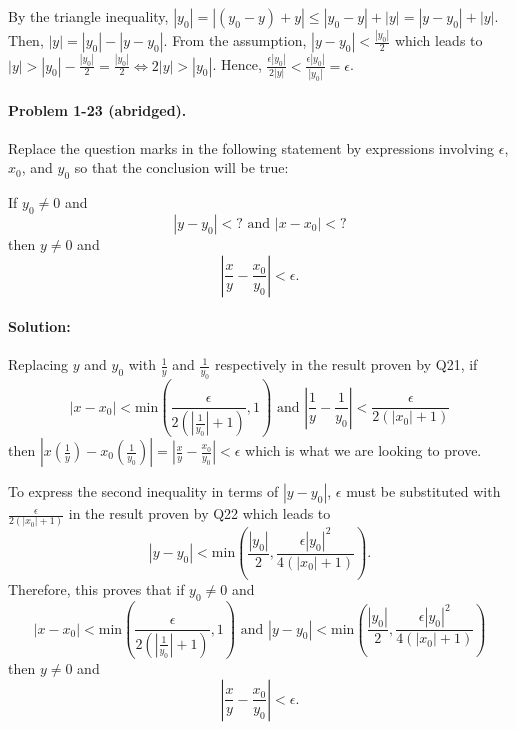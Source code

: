 \documentclass{article}
\begin{document}
By the triangle inequality, $|y_0| = |(y_0 - y) + y| \leq |y_0 - y| + |y| = |y
- y_0| + |y|$. Then, $|y| = |y_0| - |y - y_0|$. From the assumption, $|y - y_0|
< \frac{|y_0|}{2}$ which leads to $|y| > |y_0| - \frac{|y_0|}{2} =
\frac{|y_0|}{2} \iff 2|y| > |y_0|$. Hence, $\frac{\epsilon|y_0|}{2|y|} <
\frac{\epsilon|y_0|}{|y_0|} = \epsilon$.

\paragraph{Problem 1-23 (abridged).} Replace the question marks in the
following statement by expressions involving $\epsilon$, $x_0$, and $y_0$ so
that the conclusion will be true:

If $y_0 \neq 0$ and \begin{equation*}
  |y - y_0| < ? \text{ and } |x - x_0| < ?
\end{equation*} then $y \neq 0$ and \begin{equation*}
  \left|\frac{x}{y} - \frac{x_0}{y_0}\right| < \epsilon.
\end{equation*}

\paragraph{Solution:} Replacing $y$ and $y_0$ with $\frac{1}{y}$ and
$\frac{1}{y_0}$ respectively in the result proven by Q21, if \begin{equation*}
  |x - x_0| < \mathrm{min}\left(\frac{\epsilon}{2(|\frac{1}{y_0}| + 1)},
  1\right) \text{ and } \left|\frac{1}{y} - \frac{1}{y_0}\right| <
  \frac{\epsilon}{2(|x_0| + 1)}
\end{equation*} then $|x(\frac{1}{y}) - x_0(\frac{1}{y_0})| = \left|\frac{x}{y}
- \frac{x_0}{y_0}\right| < \epsilon$ which is what we are looking to prove.

To express the second inequality in terms of $|y - y_0|$, $\epsilon$ must be
substituted with $\frac{\epsilon}{2(|x_0| + 1)}$ in the result proven by Q22
which leads to \begin{equation*}
  |y - y_0| < \mathrm{min}\left(\frac{|y_0|}{2},
  \frac{\epsilon|y_0|^2}{4(|x_0| + 1)}\right).
\end{equation*}
Therefore, this proves that if $y_0 \neq 0$ and \begin{equation*}
  |x - x_0| < \mathrm{min}\left(\frac{\epsilon}{2(|\frac{1}{y_0}| + 1)},
  1\right) \text{ and } |y - y_0| < \mathrm{min}\left(\frac{|y_0|}{2},
  \frac{\epsilon|y_0|^2}{4(|x_0| + 1)}\right)
\end{equation*} then $y \neq 0$ and \begin{equation*}
  \left|\frac{x}{y} - \frac{x_0}{y_0}\right| < \epsilon.
\end{equation*}
\end{document}
